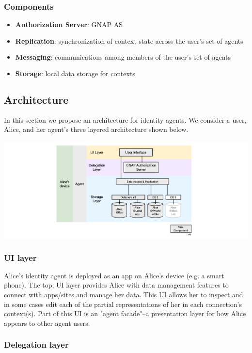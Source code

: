 \documentclass[11pt, oneside]{article}   	%
\begin{document}
\subsubsection{Components}

\begin{itemize}
\item \textbf{Authorization Server}: GNAP AS
\item \textbf{Replication}: synchronization of context state across the user's set of agents
\item \textbf{Messaging}: communications among members of the user's set of agents
\item \textbf{Storage}: local data storage for contexts  
\end{itemize}

\subsection{Architecture}

In this section we propose an architecture for identity agents. We consider a user, Alice, and her agent's three layered architecture shown below.

\includegraphics[width=\textwidth]{./images/architecture.png}

\subsubsection{UI layer}

Alice's identity agent is deployed as an app on Alice's device (e.g. a smart phone). The top, UI layer provides Alice with data management features to connect with apps/sites and manage her data. This UI allows her to inspect and in some cases edit each of the partial representations of her in each connection's context(s). Part of this UI is an "agent facade"--a presentation layer for how Alice appears to other agent users. 

\subsubsection{Delegation layer}
\end{document}
